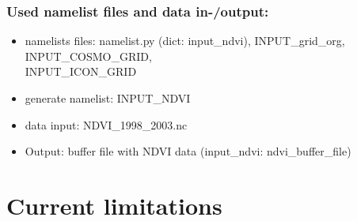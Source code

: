 \documentclass[a4paper,10pt,DIV14,BCOR1cm,titlepage,twoside]{scrartcl}
\begin{document}
\subsubsection{Used namelist files and data in-/output:}
\begin{itemize}
 \item namelists files: namelist.py (dict: input\_ndvi), INPUT\_grid\_org, INPUT\_COSMO\_GRID, \\
       INPUT\_ICON\_GRID
 \item generate namelist: INPUT\_NDVI
 \item data input: NDVI\_1998\_2003.nc
 \item Output: buffer file with NDVI data (input\_ndvi: ndvi\_buffer\_file)
\end{itemize}

\section{Current limitations}
\end{document}
